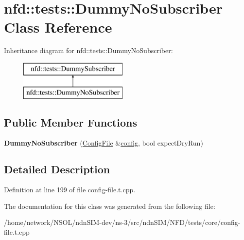 \hypertarget{classnfd_1_1tests_1_1DummyNoSubscriber}{}\section{nfd\+:\+:tests\+:\+:Dummy\+No\+Subscriber Class Reference}
\label{classnfd_1_1tests_1_1DummyNoSubscriber}
Inheritance diagram for nfd\+:\+:tests\+:\+:Dummy\+No\+Subscriber\+:\begin{figure}[H]
\begin{center}
\leavevmode
\includegraphics[height=2.000000cm]{classnfd_1_1tests_1_1DummyNoSubscriber}
\end{center}
\end{figure}
\subsection*{Public Member Functions}
\begin{DoxyCompactItemize}
\item 
{\bfseries Dummy\+No\+Subscriber} (\hyperlink{classnfd_1_1ConfigFile}{Config\+File} \&\hyperlink{classconfig}{config}, bool expect\+Dry\+Run)\hypertarget{classnfd_1_1tests_1_1DummyNoSubscriber_a6585883458d868c2a5bfcf3f4b3e2244}{}\label{classnfd_1_1tests_1_1DummyNoSubscriber_a6585883458d868c2a5bfcf3f4b3e2244}

\end{DoxyCompactItemize}


\subsection{Detailed Description}


Definition at line 199 of file config-\/file.\+t.\+cpp.



The documentation for this class was generated from the following file\+:\begin{DoxyCompactItemize}
\item 
/home/network/\+N\+S\+O\+L/ndn\+S\+I\+M-\/dev/ns-\/3/src/ndn\+S\+I\+M/\+N\+F\+D/tests/core/config-\/file.\+t.\+cpp\end{DoxyCompactItemize}
